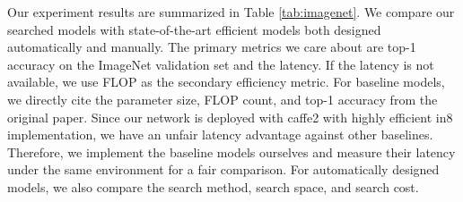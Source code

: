 \documentclass[10pt,twocolumn,letterpaper]{article}
\begin{document}
Our experiment results are summarized in Table \ref{tab:imagenet}. We compare our searched models with state-of-the-art efficient models both designed automatically and manually. The primary metrics we care about are top-1 accuracy on the ImageNet validation set and the latency. If the latency is not available, we use FLOP as the secondary efficiency metric. For baseline models, we directly cite the parameter size, FLOP count, and top-1 accuracy from the original paper. Since our network is deployed with caffe2 with highly efficient in8 implementation, we have an unfair latency advantage against other baselines. Therefore, we implement the baseline models ourselves and measure their latency under the same environment for a fair comparison. For automatically designed models, we also compare the search method, search space, and search cost. 
\end{document}
